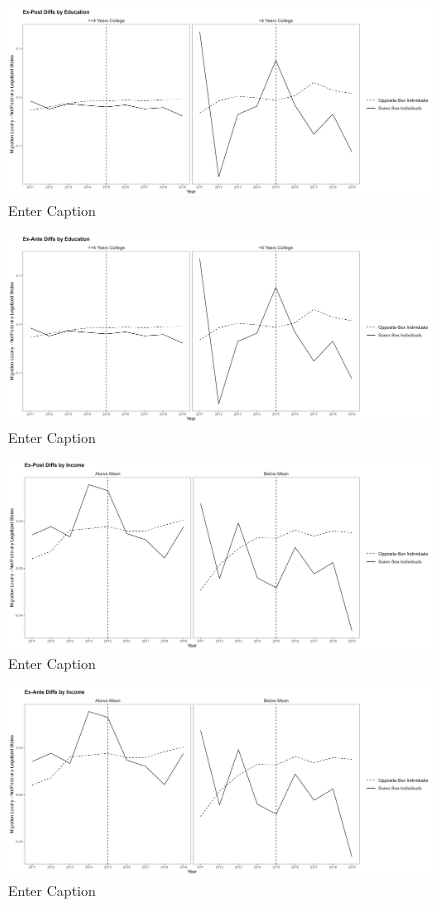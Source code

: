 \documentclass[12pt,letterpaper]{article}
\begin{document}
\begin{figure}
    \centering
    \includegraphics[width=0.75\linewidth]{outputs/summary_stats/educ_post_diffs.png}
    \caption{Enter Caption}
    \label{fig: fig:enter-label}
\end{figure}

\begin{figure}
    \centering
    \includegraphics[width=0.75\linewidth]{outputs/summary_stats/educ_ante_diffs.png}
    \caption{Enter Caption}
    \label{fig: fig:enter-label}
\end{figure}

\begin{figure}
    \centering
    \includegraphics[width=0.75\linewidth]{outputs/summary_stats/inc_post_diffs.png}
    \caption{Enter Caption}
    \label{fig: fig:enter-label}
\end{figure}

\begin{figure}
    \centering
    \includegraphics[width=0.75\linewidth]{outputs/summary_stats/inc_ante_diffs.png}
    \caption{Enter Caption}
    \label{fig: fig:enter-label}
\end{figure}
\end{document}
